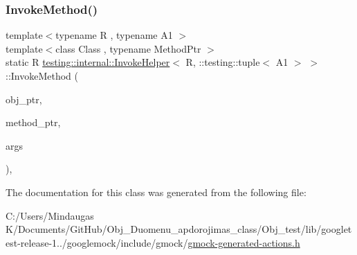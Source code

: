 \mbox{\label{classtesting_1_1internal_1_1_invoke_helper_3_01_r_00_01_1_1testing_1_1tuple_3_01_a1_01_4_01_4_a320389ba7ab6458aeb70c07a2c9e061b}} 
\subsubsection{\texorpdfstring{InvokeMethod()}{InvokeMethod()}}
{\footnotesize\ttfamily template$<$typename R , typename A1 $>$ \\
template$<$class Class , typename Method\+Ptr $>$ \\
static R \mbox{\hyperlink{classtesting_1_1internal_1_1_invoke_helper}{testing\+::internal\+::\+Invoke\+Helper}}$<$ R, \+::testing\+::tuple$<$ A1 $>$ $>$\+::Invoke\+Method (\begin{DoxyParamCaption}\item[{Class $\ast$}]{obj\+\_\+ptr,  }\item[{Method\+Ptr}]{method\+\_\+ptr,  }\item[{const \+::testing\+::tuple$<$ A1 $>$ \&}]{args }\end{DoxyParamCaption})\hspace{0.3cm}{\ttfamily [inline]}, {\ttfamily [static]}}



The documentation for this class was generated from the following file\+:\begin{DoxyCompactItemize}
\item 
C\+:/\+Users/\+Mindaugas K/\+Documents/\+Git\+Hub/\+Obj\+\_\+\+Duomenu\+\_\+apdorojimas\+\_\+class/\+Obj\+\_\+test/lib/googletest-\/release-\/1../googlemock/include/gmock/\mbox{\hyperlink{_obj__test_2lib_2googletest-release-1_88_81_2googlemock_2include_2gmock_2gmock-generated-actions_8h}{gmock-\/generated-\/actions.\+h}}\end{DoxyCompactItemize}
